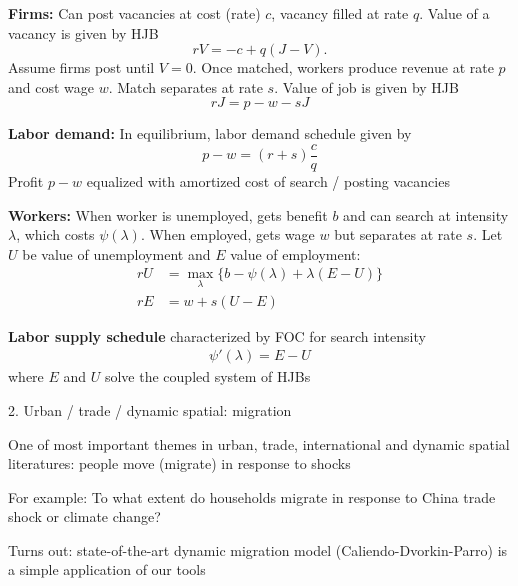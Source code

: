 \documentclass[11pt, aspectratio=169]{beamer}
\newenvironment{witemize}{\itemize\addtolength{\itemsep}{10pt}}{\enditemize}
\begin{document}
\begin{frame}{}

\textbf{Firms:} Can post vacancies at cost (rate) $c$, vacancy filled at rate $q$. Value of a vacancy is given by HJB
\begin{equation*}
	r V = - c + q(J-V).
\end{equation*}
Assume firms post until $V = 0$. Once matched, workers produce revenue at rate $p$ and cost wage $w$. Match separates at rate $s$. Value of job is given by HJB 
\begin{equation*}
	r J = p - w - s J
\end{equation*}

\vspace{5mm}
\textbf{Labor demand:} 
In equilibrium, labor demand schedule given by
\begin{equation*}
	p-w = (r+s) \frac{c}{q}
\end{equation*}
Profit $p-w$ equalized with amortized cost of search / posting vacancies 

\end{frame}

\begin{frame}{}

\textbf{Workers:}
When worker is unemployed, gets benefit $b$ and can search at intensity $\lambda$, which costs $\psi(\lambda)$. When employed, gets wage $w$ but separates at rate $s$. Let $U$ be value of unemployment and $E$ value of employment:
\begin{align*}
	r U &= \max_\lambda \Big\{ b - \psi(\lambda) + \lambda(E - U) \Big\} \\
	r E &= w + s(U - E)
\end{align*}

\vspace{5mm}
\textbf{Labor supply schedule} characterized by FOC for search intensity
\begin{align*}
	\psi'(\lambda) = E - U
\end{align*}
where $E$ and $U$ solve the coupled system of HJBs

\end{frame}


\begin{frame}{2. Urban / trade / dynamic spatial: migration}
\begin{witemize}
\item One of most important themes in urban, trade, international and dynamic spatial literatures: people move (migrate) in response to shocks

	{\footnotesize For example: To what extent do households migrate in response to China trade shock or climate change?}

\item Turns out: state-of-the-art dynamic migration model (Caliendo-Dvorkin-Parro) is a simple application of our tools

\end{witemize}
\end{frame}
\end{document}
